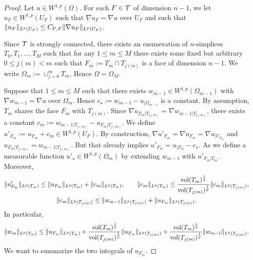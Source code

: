 \documentclass[a4paper]{article}
\begin{document}
\begin{proof}
 Let $u \in W^{1,p}(\Omega)$. 
 For each $F \in {\mathcal T}$ of dimension $n-1$, 
 we let $u_F \in W^{1,p}(U_F)$ such that $\nabla u_F = \nabla u$ over $U_F$ and such that $\| u_F \|_{L^{p}(U_F)} \leq C_{{\rm{P}},F} \| \nabla u_F \|_{L^{p}(U_F)}$.
 
 Since ${\mathcal T}$ is strongly connected, there exists an enumeration of $n$-simplices $T_0, T_1, \dots, T_M$ such that for any $1 \leq m \leq M$ there exists some fixed but arbitrary $0 \leq j(m) < m$ such that $F_m := T_m \cap T_{j(m)}$ is a face of dimension $n-1$. We write $\Omega_m := \cup_{j=0}^{m} T_m$. Hence $\Omega = \Omega_M$. 
 
 
 
 Suppose that $1 \leq m \leq M$ such that there exists $w_{m-1} \in W^{1,p}(\Omega_{m-1})$ with $\nabla w_{m-1} = \nabla u$ over $\Omega_m$. Hence $c_{\star} := w_{m-1} - u_{|\Omega_{m-1}}$ is a constant. 
 By assumption, $T_{m}$ shares the face $F_{m}$ with $T_{j(m)}$. 
 Since $\nabla u_{F_{m}|T_{j(m)}} = \nabla w_{m-1|T_{j(m)}}$,
 there exists a constant $c_{m} := w_{m-1|T_{j(m)}} - u_{F_{m}|T_{j(m)}}$.
 We define $u'_{F_m} := u_{F_m} + c_{m} \in W^{1,p}(U_F)$.
 By construction, $\nabla u'_{F_m} = \nabla u_{F_m} = \nabla u_{|U_{F_m}}$ and $u_{F_{m}|T_{j(m)}} = w_{m-1|T_{j(m)}}$. 
 But that already implies $u'_{F_m} = u_{|F_m} - c_{\star}$. 
 As we define a measurable function $u'_{\star} \in W^{1,p}(\Omega_m)$ by extending $w_{m-1}$ with $u'_{F_m|T_m}$.
 Moreover, 
 \begin{gather*}
    \| u'_{F_m} \|_{L^{p}(T_m)}
    \leq 
    \| u_{F_m} \|_{L^{p}(T_m)}
    +
    \| c_{m} \|_{L^{p}(T_m)},
    \qquad 
    \| c_{m} \|_{L^{p}(T_m)}
    \leq 
    \frac{ \operatorname{vol}(T_m)^{\frac 1 p} }{ \operatorname{vol}(T_{j(m)})^{\frac 1 p} }
    \| c_{m} \|_{L^{p}(T_{j(m)})},
    \\ 
    \| c_{m} \|_{L^{p}(T_{j(m)})}
    \leq 
    \| w_{m-1}\|_{L^{p}(T_{j(m)})} + \| u_{F_{m}} \|_{L^{p}(T_{j(m)})} 
    .
 \end{gather*}
 In particular,
 \begin{align*}
    \| w_{m} \|_{L^{p}(T_m)}
    \leq 
    \| u_{F_m} \|_{L^{p}(T_m)}
    +
    \frac{ \operatorname{vol}(T_m)^{\frac 1 p} }{ \operatorname{vol}(T_{j(m)})^{\frac 1 p} }
    \| u_{F_{m}} \|_{L^{p}(T_{j(m)})}
    +
    \frac{ \operatorname{vol}(T_m)^{\frac 1 p} }{ \operatorname{vol}(T_{j(m)})^{\frac 1 p} }
    \| w_{m-1}\|_{L^{p}(T_{j(m)})}
    .
 \end{align*}
 We want to summarize the two integrals of $u_{F_m}$. 
 

\end{proof}
\end{document}
